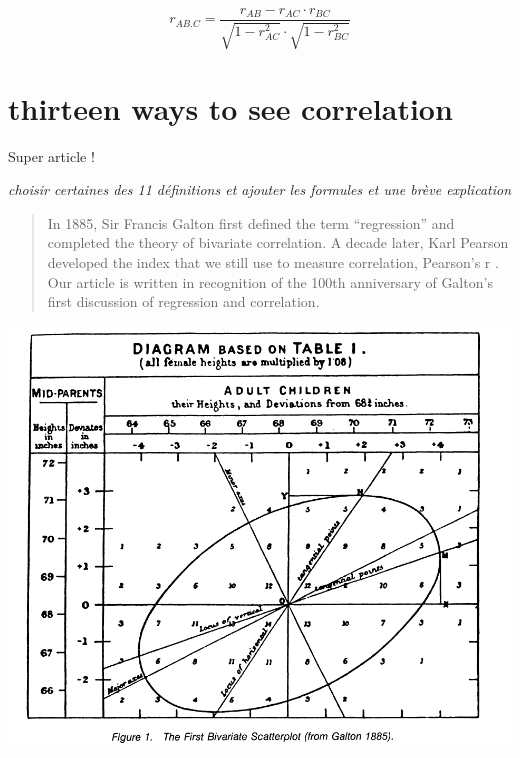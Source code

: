 \documentclass[
]{report}
\begin{document}
\[r_{AB.C}=\frac{r_{AB}-r_{AC} \cdot r_{BC}}{\sqrt{1-r_{AC}^2} \cdot \sqrt{1-r_{BC}^2}}\]

\hypertarget{thirteen-ways-to-see-correlation-13cor}{%
\section{\texorpdfstring{thirteen ways to see correlation \citep{13cor}}{thirteen ways to see correlation {[}@13cor{]}}}\label{thirteen-ways-to-see-correlation-13cor}}

Super article !

\emph{choisir certaines des 11 définitions et ajouter les formules et une brève explication}

\begin{quote}
In 1885, Sir Francis Galton first defined the term ``regression'' and completed the theory of bivariate correlation. A decade later, Karl Pearson developed the index that we still use to measure correlation, Pearson's r . Our article is written in recognition of the 100th anniversary of Galton's first discussion of regression and correlation.
\end{quote}

\includegraphics{galton.PNG}
\end{document}
